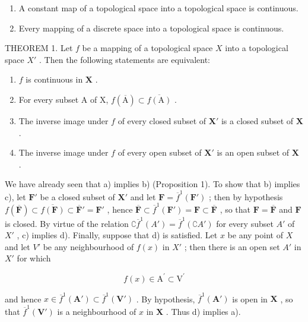 \begin{enumerate}
\def\labelenumi{\arabic{enumi})}
\setcounter{enumi}{1}
\item
  A constant map of a topological space into a topological space is continuous.
\item
  Every mapping of a discrete space into a topological space is continuous.
\end{enumerate}

THEOREM 1. Let \(f\) be a mapping of a topological space \(X\) into a topological space \(X'\) . Then the following statements are equivalent:

\begin{enumerate}
\def\labelenumi{\alph{enumi})}
\item
  \(f\) is continuous in \(\mathbf{X}\) .
\item
  For every subset A of X, \(f(\overline{\mathrm{A}}) \subset \overline{f(\mathrm{A})}\) .
\item
  The inverse image under \(f\) of every closed subset of \(\mathbf{X}'\) is a closed subset of \(\mathbf{X}\) .
\item
  The inverse image under \(f\) of every open subset of \(\mathbf{X}'\) is an open subset of \(\mathbf{X}\) .
\end{enumerate}

We have already seen that a) implies b) (Proposition 1). To show that b) implies c), let \(\mathbf{F}'\) be a closed subset of \(\mathbf{X}'\) and let \(\mathbf{F} = \overline{f}^{1}(\mathbf{F}')\) ; then by hypothesis \(f(\overline{\mathbf{F}}) \subset \overline{f(\mathbf{F})} \subset \overline{\mathbf{F}}' = \mathbf{F}'\) , hence \(\overline{\mathbf{F}} \subset \overline{f}^{1}(\mathbf{F}') = \mathbf{F} \subset \overline{\mathbf{F}}\) , so that \(\mathbf{F} = \overline{\mathbf{F}}\) and \(\mathbf{F}\) is closed. By virtue of the relation \(\complement \overline{f}^{1}(A') = \overline{f}^{1}(\complement A')\) for every subset \(A'\) of \(X'\) , c) implies d). Finally, suppose that d) is satisfied. Let \(x\) be any point of \(X\) and let \(V'\) be any neighbourhood of \(f(x)\) in \(X'\) ; then there is an open set \(A'\) in \(X'\) for which

\[
f (x) \in \mathrm{A} ^ {\prime} \subset \mathrm{V} ^ {\prime}
\]

and hence \(x \in \overline{f}^1(\mathbf{A}') \subset \overline{f}^1(\mathbf{V}')\) . By hypothesis, \(\overline{f}^1(\mathbf{A}')\) is open in \(\mathbf{X}\) , so that \(\overline{f}^1(\mathbf{V}')\) is a neighbourhood of \(x\) in \(\mathbf{X}\) . Thus d) implies a).

